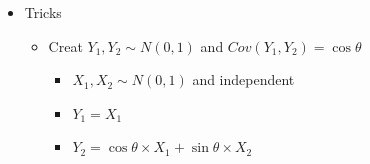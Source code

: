 \documentclass[a4paper]{article}
\begin{document}
\begin{itemize}
\begin{itemize}
        \end{itemize}
    \item Tricks
        \begin{itemize}
            \item Creat $Y_1, Y_2 \sim N(0, 1)$ and $\mathit{Cov}(Y_1, Y_2) = \cos \theta$
                \begin{itemize}
                    \item $X_1, X_2 \sim N(0, 1)$ and independent
                    \item $Y_1 = X_1$
                    \item $Y_2 = \cos \theta \times X_1 + \sin \theta \times X_2$
                \end{itemize}
        \end{itemize}
\end{itemize}
\end{document}
